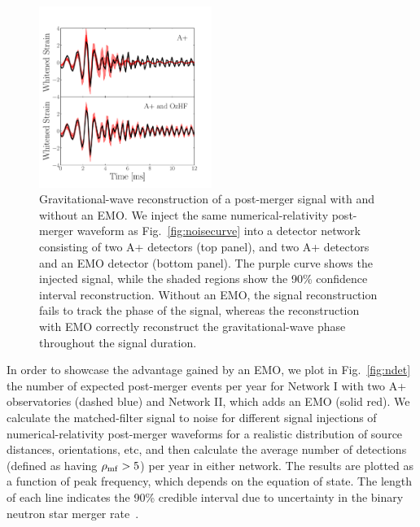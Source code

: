 \documentclass[prx,superscriptaddress,twocolumn,nopreprintnumbers,floatfix,nofootinbib]{revtex4}
\newcommand{\red}[1]{\textcolor{red}{#1}}
\begin{document}


\begin{figure}[htb]
\centering
\includegraphics[width=0.5\textwidth]{BayesWaveTimeSeries.pdf}
\caption{Gravitational-wave reconstruction of a post-merger signal with and without an EMO.  We inject the same numerical-relativity post-merger waveform as Fig.~\ref{fig:noisecurve} into a detector network consisting of two A+ detectors (top panel), and two A+ detectors and an EMO detector (bottom panel).  The purple curve shows the injected signal, while the shaded regions show the 90\% confidence interval reconstruction.  Without an EMO, the signal reconstruction fails to track the phase of the signal, whereas the reconstruction with EMO correctly reconstruct the gravitational-wave phase throughout the signal duration.}
\label{fig:post-merger}
\end{figure}

In order to showcase the advantage gained by an EMO, we plot in Fig.~\ref{fig:ndet} the number of expected post-merger events per year for Network I with two A+ observatories (dashed blue) and Network II, which adds an EMO (solid red).
We calculate the matched-filter signal to noise for different signal injections of numerical-relativity post-merger waveforms for a realistic distribution of source distances, orientations, etc, and then calculate the average number of detections (defined as having $\rho_{\rm mf}>5$) per year in either network.
The results are plotted as a function of peak frequency, which depends on the equation of state.
The length of each line indicates the 90\% credible interval due to uncertainty in the binary neutron star merger rate~\cite{GW190425}.
\end{document}
